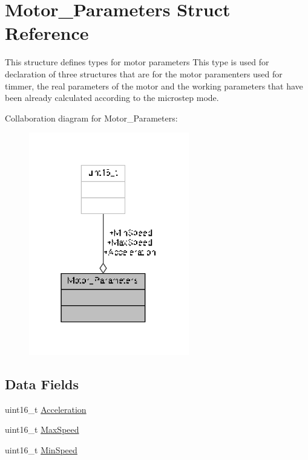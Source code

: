 \hypertarget{structMotor__Parameters}{\section{Motor\-\_\-\-Parameters Struct Reference}
\label{structMotor__Parameters}
}


This structure defines types for motor parameters This type is used for declaration of three structures that are for the motor paramenters used for timmer, the real parameters of the motor and the working parameters that have been already calculated according to the microstep mode.  




Collaboration diagram for Motor\-\_\-\-Parameters\-:
\nopagebreak
\begin{figure}[H]
\begin{center}
\leavevmode
\includegraphics[width=198pt]{structMotor__Parameters__coll__graph}
\end{center}
\end{figure}
\subsection*{Data Fields}
\begin{DoxyCompactItemize}
\item 
uint16\-\_\-t \hyperlink{structMotor__Parameters_aa9f1146edc6d945d535eec80a01481f1}{Acceleration}
\item 
uint16\-\_\-t \hyperlink{structMotor__Parameters_a501458e333945f49f03c295e2f49e3b9}{Max\-Speed}
\item 
uint16\-\_\-t \hyperlink{structMotor__Parameters_aaf0ac3ed818f5c89cc86ea1d9174dc43}{Min\-Speed}
\end{DoxyCompactItemize}


